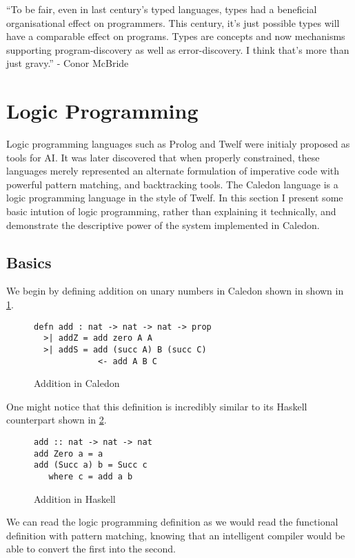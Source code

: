 ``To be fair, even in last century's typed languages, 
types had a beneficial organisational effect on programmers. 
This century, it's just possible types will have a comparable effect on programs. 
Types are concepts and now mechanisms supporting program-discovery as well as error-discovery. 
I think that's more than just gravy.''
 - Conor McBride

\section{Logic Programming}

Logic programming languages such as Prolog and Twelf were initialy proposed as tools for AI.  
It was later discovered that when properly constrained, these languages merely represented an alternate
formulation of imperative code with powerful pattern matching, and backtracking tools.  The Caledon language
is a logic programming language in the style of Twelf.  In this section I present some basic intution of logic 
programming, rather than explaining it technically, and demonstrate the descriptive
power of the system implemented in Caledon.

\FloatBarrier
\subsection{Basics}
We begin by defining addition on unary numbers in Caledon shown in shown in \ref{code:add}.

\begin{figure}[H]
\begin{lstlisting}
defn add : nat -> nat -> nat -> prop
  >| addZ = add zero A A
  >| addS = add (succ A) B (succ C) 
             <- add A B C
\end{lstlisting}
\caption{Addition in Caledon}
\label{code:add}
\end{figure}

One might notice that this definition is incredibly similar to its Haskell counterpart shown in \ref{code:hask}.

\begin{figure}[H]
\begin{lstlisting}
add :: nat -> nat -> nat
add Zero a = a
add (Succ a) b = Succ c
   where c = add a b
\end{lstlisting}
\caption{Addition in Haskell}
\label{code:hask}
\end{figure}

We can read the logic programming definition as we would read the functional definition with pattern
matching, knowing that an intelligent compiler would be able to convert the first into the second.  


